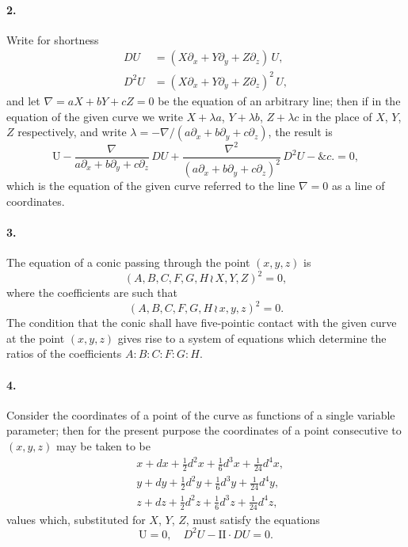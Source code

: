 \documentclass[11pt,a4paper]{book}
\begin{document}
\paragraph{2.}
Write  for  shortness
\begin{align*}
DU &= (X\partial_x + Y\partial_y + Z\partial_z) \, U, \\
D^2 U &= (X\partial_x + Y\partial_y + Z\partial_z)^2 \, U,
\end{align*}
and  let  $\nabla = aX + bY + cZ = 0$  be  the  equation  of  an  arbitrary  line;  then  if  in  the  equation
of  the  given  curve  we  write  $X + \lambda a$,  $Y + \lambda b$,  $Z + \lambda c$  in  the  place  of  $X$,  $Y$,  $Z$
respectively,  and  write  $\lambda = -\nabla / (a\partial_x + b\partial_y + c\partial_z)$,  the  result  is
\[
\mathrm{U} - \frac{\nabla}{a\partial_x + b\partial_y + c\partial_z} \, DU
  + \frac{\nabla^2}{(a\partial_x + b\partial_y + c\partial_z)^2} \, D^2 U - \&c. = 0,
\]
which  is  the  equation  of  the  given  curve  referred  to  the  line  $\nabla = 0$  as  a  line  of  coordinates.

\paragraph{3.}
The  equation  of  a  conic  passing  through  the  point  $(x, y, z)$  is
\[
(A, B, C, F, G, H \,\!\!\wr\, X, Y, Z)^2 = 0,
\]
where  the  coefficients  are  such  that
\[
(A, B, C, F, G, H \,\!\!\wr\, x, y, z)^2 = 0.
\]
The  condition  that  the  conic  shall  have  five-pointic  contact  with  the  given  curve  at  the
point  $(x, y, z)$  gives  rise  to  a  system  of  equations  which  determine  the  ratios  of  the
coefficients  $A : B : C : F : G : H$.


\paragraph{4.}
Consider  the  coordinates  of  a  point  of  the  curve  as  functions  of  a  single
variable  parameter;  then  for  the  present  purpose  the  coordinates  of  a  point  consecutive
to  $(x, y, z)$  may  be  taken  to  be
\begin{align*}
&x + dx + \tfrac{1}{2}d^2x + \tfrac{1}{6}d^3x + \tfrac{1}{24}d^4x, \\
&y + dy + \tfrac{1}{2}d^2y + \tfrac{1}{6}d^3y + \tfrac{1}{24}d^4y, \\
&z + dz + \tfrac{1}{2}d^2z + \tfrac{1}{6}d^3z + \tfrac{1}{24}d^4z,
\end{align*}
values  which,  substituted  for  $X$,  $Y$,  $Z$,  must  satisfy  the  equations
\[
\mathrm{U} = 0, \quad D^2 U - \mathrm{II} \cdot DU = 0.
\]
\end{document}
